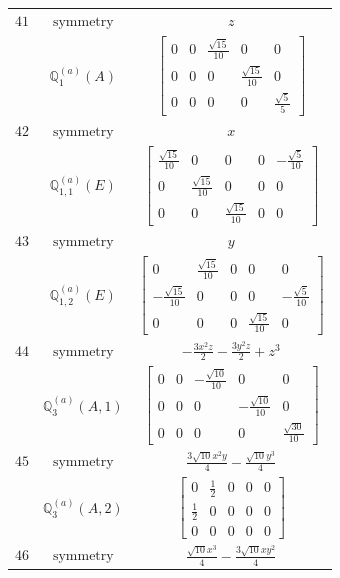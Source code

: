 \documentclass[fleqn,8pt,landscape]{jsarticle}
\begin{document}
\begin{longtable}{ccc}
$ 41 $ & $ \text{symmetry} $ & $ z $ \\
$  $ & $ \mathbb{Q}_{1}^{(a)}(A) $ & $ \begin{bmatrix} 0 & 0 & \frac{\sqrt{15}}{10} & 0 & 0 \\ 0 & 0 & 0 & \frac{\sqrt{15}}{10} & 0 \\ 0 & 0 & 0 & 0 & \frac{\sqrt{5}}{5} \end{bmatrix} $ \\ \hline
$ 42 $ & $ \text{symmetry} $ & $ x $ \\
$  $ & $ \mathbb{Q}_{1,1}^{(a)}(E) $ & $ \begin{bmatrix} \frac{\sqrt{15}}{10} & 0 & 0 & 0 & - \frac{\sqrt{5}}{10} \\ 0 & \frac{\sqrt{15}}{10} & 0 & 0 & 0 \\ 0 & 0 & \frac{\sqrt{15}}{10} & 0 & 0 \end{bmatrix} $ \\ \hline
$ 43 $ & $ \text{symmetry} $ & $ y $ \\
$  $ & $ \mathbb{Q}_{1,2}^{(a)}(E) $ & $ \begin{bmatrix} 0 & \frac{\sqrt{15}}{10} & 0 & 0 & 0 \\ - \frac{\sqrt{15}}{10} & 0 & 0 & 0 & - \frac{\sqrt{5}}{10} \\ 0 & 0 & 0 & \frac{\sqrt{15}}{10} & 0 \end{bmatrix} $ \\ \hline
$ 44 $ & $ \text{symmetry} $ & $ - \frac{3 x^{2} z}{2} - \frac{3 y^{2} z}{2} + z^{3} $ \\
$  $ & $ \mathbb{Q}_{3}^{(a)}(A,1) $ & $ \begin{bmatrix} 0 & 0 & - \frac{\sqrt{10}}{10} & 0 & 0 \\ 0 & 0 & 0 & - \frac{\sqrt{10}}{10} & 0 \\ 0 & 0 & 0 & 0 & \frac{\sqrt{30}}{10} \end{bmatrix} $ \\ \hline
$ 45 $ & $ \text{symmetry} $ & $ \frac{3 \sqrt{10} x^{2} y}{4} - \frac{\sqrt{10} y^{3}}{4} $ \\
$  $ & $ \mathbb{Q}_{3}^{(a)}(A,2) $ & $ \begin{bmatrix} 0 & \frac{1}{2} & 0 & 0 & 0 \\ \frac{1}{2} & 0 & 0 & 0 & 0 \\ 0 & 0 & 0 & 0 & 0 \end{bmatrix} $ \\ \hline
$ 46 $ & $ \text{symmetry} $ & $ \frac{\sqrt{10} x^{3}}{4} - \frac{3 \sqrt{10} x y^{2}}{4} $ \\

\end{longtable}
\end{document}
